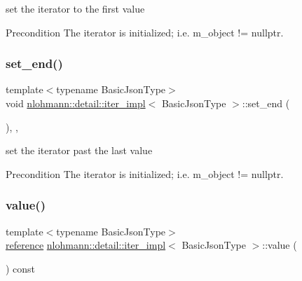 set the iterator to the first value 

\begin{DoxyPrecond}{Precondition}
The iterator is initialized; i.\+e. {\ttfamily m\+\_\+object != nullptr}. 
\end{DoxyPrecond}
\mbox{\label{classnlohmann_1_1detail_1_1iter__impl_a23e50ad4c13aa62d9ac7f60a123823ee}} 
\subsubsection{\texorpdfstring{set\+\_\+end()}{set\_end()}}
{\footnotesize\ttfamily template$<$typename Basic\+Json\+Type$>$ \\
void \mbox{\hyperlink{classnlohmann_1_1detail_1_1iter__impl}{nlohmann\+::detail\+::iter\+\_\+impl}}$<$ Basic\+Json\+Type $>$\+::set\+\_\+end (\begin{DoxyParamCaption}{ }\end{DoxyParamCaption})\hspace{0.3cm}{\ttfamily [inline]}, {\ttfamily [private]}, {\ttfamily [noexcept]}}



set the iterator past the last value 

\begin{DoxyPrecond}{Precondition}
The iterator is initialized; i.\+e. {\ttfamily m\+\_\+object != nullptr}. 
\end{DoxyPrecond}
\mbox{\label{classnlohmann_1_1detail_1_1iter__impl_ab447c50354c6611fa2ae0100ac17845c}} 
\subsubsection{\texorpdfstring{value()}{value()}}
{\footnotesize\ttfamily template$<$typename Basic\+Json\+Type$>$ \\
\mbox{\hyperlink{classnlohmann_1_1detail_1_1iter__impl_a5be8001be099c6b82310f4d387b953ce}{reference}} \mbox{\hyperlink{classnlohmann_1_1detail_1_1iter__impl}{nlohmann\+::detail\+::iter\+\_\+impl}}$<$ Basic\+Json\+Type $>$\+::value (\begin{DoxyParamCaption}{ }\end{DoxyParamCaption}) const\hspace{0.3cm}{\ttfamily [inline]}}




